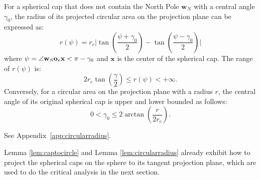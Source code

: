 \documentclass[final]{IEEEtran}
\newtheorem{corollary}{Corollary}
\begin{document}
\begin{lemma}\label{lem:circularradius}
     For a spherical cap that does not contain the North Pole $\textbf{w}_N$ with a central angle $\gamma_0$, the radius of its projected circular area on the projection plane can be expressed as:
\begin{equation}
    r(\psi)=r_e\bigg|\tan(\frac{\psi+\gamma_0}{2})-\tan(\frac{\psi-\gamma_0}{2})\bigg|        
\label{radiusprojection}
\end{equation}
where $\psi=\angle \textbf{w}_S \textbf{o}_e \textbf{x}<\pi-\gamma_0$ and $\textbf{x}$ is the center of the spherical cap. The range of $r(\psi)$ is:
\begin{equation}
    2r_e\tan(\frac{\gamma}{2})\leq r(\psi)<+\infty.
\end{equation}
Conversely, for a circular area on the projection plane with a radius $r$, the central angle of its original spherical cap is upper and lower bounded as follows:
\begin{equation}
    0<\gamma_0\leq 2\arctan(\frac{r}{2r_e}).
\end{equation}
\end{lemma}
\begin{IEEEproof}
    See Appendix~\ref{app:circularradius}.
\end{IEEEproof}
\indent Lemma \ref{lem:captocircle} and Lemma \ref{lem:circularradius} already exhibit how to project the spherical caps on the sphere to its tangent projection plane, which are used to do the critical analysis in the next section.
\end{document}
